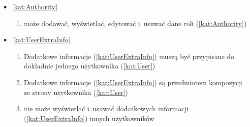 \begin{itemize}[label={\textbf{Reguły dla}}, wide, labelwidth=!, labelindent=0pt]
\begin{enumerate}[label={\textbf{REG/\protect\threedigits{\arabic{enumi}}}}, wide, labelwidth=!, align=left, leftmargin=3cm, resume]
    \end{enumerate}
    \item\ref{kat:Authority}
    \begin{enumerate}[label={\textbf{REG/\protect\threedigits{\arabic{enumi}}}}, wide, labelwidth=!, align=left, leftmargin=3cm, resume]
        \item {} może dodawać, wyświetlać, edytować i~usuwać dane roli (\ref{kat:Authority})
    \end{enumerate}
    \item\ref{kat:UserExtraInfo}
    \begin{enumerate}[label={\textbf{REG/\protect\threedigits{\arabic{enumi}}}}, wide, labelwidth=!, align=left, leftmargin=3cm, resume]
        \item Dodatkowe informacje (\ref{kat:UserExtraInfo}) muszą być przypisane do dokładnie jednego użytkownika (\ref{kat:User})
        \item Dodatkowe informacje (\ref{kat:UserExtraInfo}) są przedmiotem kompozycji ze strony użytkownika (\ref{kat:User})
        \item {} nie może wyświetlać i~usuwać dodatkowych informacji (\ref{kat:UserExtraInfo}) innych użytkowników
    \end{enumerate}

\end{itemize}
